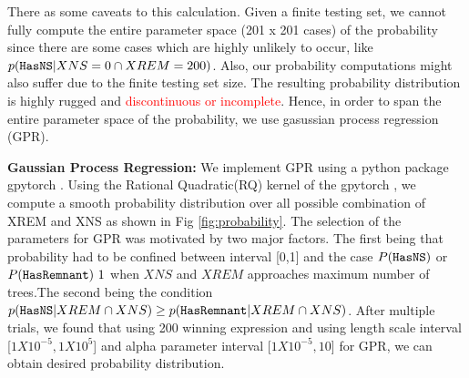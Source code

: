There as some caveats to this calculation. Given a finite testing set, we cannot fully compute the entire parameter space (201 x 201 cases) of the probability since there are some cases which are highly unlikely to occur, like $p({{\tt HasNS}} | XNS=0 \cap XREM=200)$. Also, our probability computations might also suffer due to the finite testing set size. The resulting probability distribution is highly rugged and \textcolor{red}{discontinuous or incomplete}. Hence, in order to span the entire parameter space of the probability, we use gasussian process regression (GPR). 

\textbf{Gaussian Process Regression:} We implement GPR using a python package gpytorch \cite{gpytorch}. Using the Rational Quadratic(RQ) kernel of the gpytorch , we compute a smooth probability distribution over all possible combination of XREM and XNS as shown in Fig \ref{fig:probability}. The selection of the parameters for GPR was motivated by two major factors. The first being that probability had to be confined between interval [0,1] and the case $P({{\tt HasNS}})$ or $P({{\tt HasRemnant}}) ~ 1$ when $XNS$ and $XREM$ approaches maximum number of trees.The second being the condition $p({{\tt HasNS}}| XREM \cap XNS) \geq p({{\tt HasRemnant}}| XREM \cap XNS)$. After multiple trials, we found that using 200 winning expression and using length scale interval [$1X10^{-5}, 1X10^{5}$] and alpha parameter interval [$1X10^{-5}, 10$] for GPR, we can obtain desired probability distribution.

